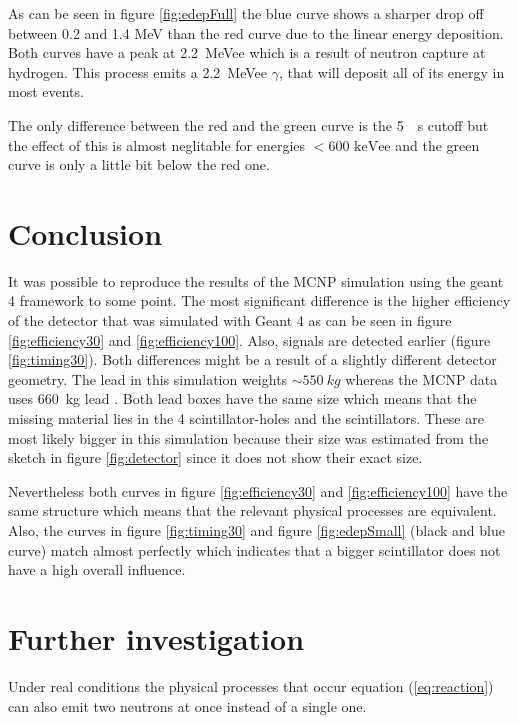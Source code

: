 \documentclass[12pt]{article}
\begin{document}
 As can be seen in figure \ref{fig:edepFull} the blue curve shows a sharper drop off between 0.2 and 1.4 MeV than the red curve due to the linear energy deposition. Both curves have a peak at \SI{2.2}{MeVee} which is a result of neutron capture at hydrogen. This process emits a \SI{2.2}{MeVee} $\gamma$, that will deposit all of its energy in most events.
 
The only difference between the red and the green curve is the \SI{5}{\SIUnitSymbolMicro s} cutoff but the effect of this is almost neglitable for energies $<600 \text{ keVee}$ and the green curve is only a little bit below the red one.
 
\section{Conclusion}
It was possible to reproduce the results of the MCNP simulation using the geant 4 framework to some point. The most significant difference is the higher efficiency of the detector that was simulated with Geant 4 as can be seen in figure \ref{fig:efficiency30} and \ref{fig:efficiency100}. Also, signals are detected earlier (figure \ref{fig:timing30}). Both differences might be a result of a slightly different detector geometry. The lead in this simulation weights $\sim \SI{550}{kg}$ whereas the MCNP data uses \SI{660}{kg} lead \cite[p.1]{MCNP}. Both lead boxes have the same size which means that the missing material lies in the 4 scintillator-holes and the scintillators. These are most likely bigger in this simulation because their size was estimated from the sketch in figure \ref{fig:detector} since it does not show their exact size.

Nevertheless both curves in figure \ref{fig:efficiency30} and \ref{fig:efficiency100} have the same structure which means that the relevant physical processes are equivalent. Also, the curves in figure \ref{fig:timing30} and figure \ref{fig:edepSmall} (black and blue curve) match almost perfectly which indicates that a bigger scintillator does not have a high overall influence.

\section{Further investigation}
Under real conditions the physical processes that occur equation (\ref{eq:reaction}) can also emit two neutrons at once instead of a single one. 
\end{document}
